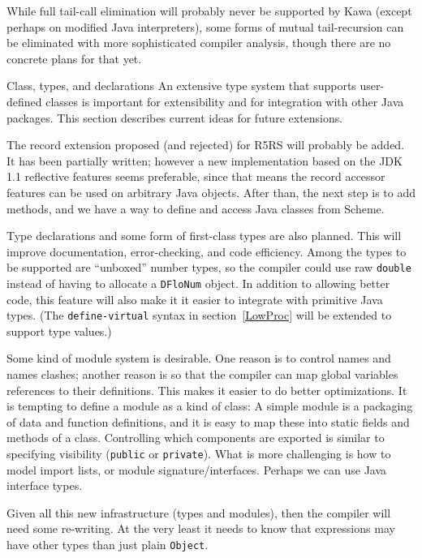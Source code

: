 \documentclass[twocolumn]{article}
\makeatletter
\def\section{\@startsection {section}{1}{\z@}
   {14pt plus 2pt minus 2pt}{12pt plus 2pt minus 2pt} {\large\bf}}
\makeatother
\begin{document}
While full tail-call elimination will probably never be supported
by Kawa (except perhaps on modified Java interpreters),
some forms of mutual tail-recursion can be eliminated with
more sophisticated compiler analysis, though there are no concrete
plans for that yet.

\section{Class, types, and declarations}
\label{Types}
An extensive type system that supports user-defined classes is
important for extensibility and for integration with other Java packages.
This section describes current ideas for future extensions.

The record extension proposed (and rejected) for R5RS will
probably be added.  It has been partially written; however
a new implementation based on the JDK 1.1 reflective features
seems preferable, since that means the record accessor
features can be used on arbitrary Java objects.
After than, the next step is to add methods, and we have a way to define
and access Java classes from Scheme.

Type declarations and some form of first-class
types are also planned.  This will improve documentation,
error-checking, and code efficiency.  Among the types to be
supported are ``unboxed'' number types, so the compiler
could use raw {\tt double} instead of having to allocate
a {\tt DFloNum} object.  In addition to allowing better code,
this feature will also make it it easier to integrate with
primitive Java types.  (The {\tt define-virtual} syntax in
section~\ref{LowProc} will be extended to support type values.)

Some kind of module system is desirable.  One reason is to
control names and names clashes;  another reason is so that
the compiler can map global variables references to their
definitions. This makes it easier to do better optimizations.
It is tempting to define a module as a kind of class:
A simple module is a packaging of data and function definitions,
and it is easy to map these into static fields and methods of a class.
Controlling which components are exported is similar to
specifying visibility ({\tt public} or {\tt private}).
What is more challenging is how to model import lists,
or module signature/interfaces.  Perhaps we can use Java interface types.

Given all this new infrastructure (types and modules),
then the compiler will need some re-writing.  At the very least it
needs to know that expressions may have other types than just
plain {\tt Object}.
\end{document}
